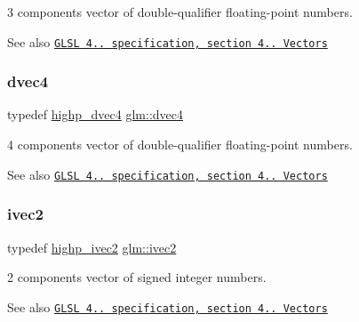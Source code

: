 3 components vector of double-\/qualifier floating-\/point numbers.

\begin{DoxySeeAlso}{See also}
\href{http://www.opengl.org/registry/doc/GLSLangSpec.4.20.8.pdf}{\tt G\+L\+SL 4.. specification, section 4.. Vectors} 
\end{DoxySeeAlso}
\mbox{\label{group__core__types_ga0824ceed7ec3b2fba89765501c1540b5}} 
\subsubsection{\texorpdfstring{dvec4}{dvec4}}
{\footnotesize\ttfamily typedef \mbox{\hyperlink{group__core__precision_ga6e8645fa38f0260e57f1fb7555de0c2f}{highp\+\_\+dvec4}} \mbox{\hyperlink{group__core__types_ga0824ceed7ec3b2fba89765501c1540b5}{glm\+::dvec4}}}

4 components vector of double-\/qualifier floating-\/point numbers.

\begin{DoxySeeAlso}{See also}
\href{http://www.opengl.org/registry/doc/GLSLangSpec.4.20.8.pdf}{\tt G\+L\+SL 4.. specification, section 4.. Vectors} 
\end{DoxySeeAlso}
\mbox{\label{group__core__types_ga9e6ce9cfc7919976b318197e18d8a065}} 
\subsubsection{\texorpdfstring{ivec2}{ivec2}}
{\footnotesize\ttfamily typedef \mbox{\hyperlink{group__core__precision_gad2b0693752b92e6644be9f1c3e50a451}{highp\+\_\+ivec2}} \mbox{\hyperlink{group__core__types_ga9e6ce9cfc7919976b318197e18d8a065}{glm\+::ivec2}}}

2 components vector of signed integer numbers.

\begin{DoxySeeAlso}{See also}
\href{http://www.opengl.org/registry/doc/GLSLangSpec.4.20.8.pdf}{\tt G\+L\+SL 4.. specification, section 4.. Vectors} 
\end{DoxySeeAlso}
\mbox{\label{group__core__types_ga6e12a4ca00d696f07da1df4eb73e0fe8}} 
